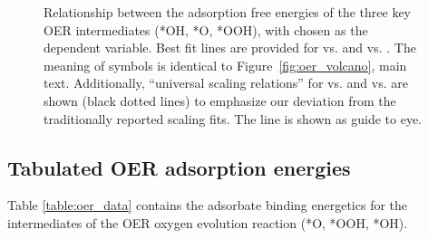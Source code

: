 \begin{figure}[!htb]
\centering
{}
\caption{\label{fig:scaling_relations}
%
Relationship between the adsorption free energies of the three key OER intermediates (*OH, *O, *OOH), with \DGOH chosen as the dependent variable.
%
Best fit lines are provided for \DGOOH vs. \DGOH and \DGO vs. \DGOH.
%
The meaning of symbols is identical to Figure~\ref{fig:oer_volcano}, main text.
%
Additionally, ``universal scaling relations'' for \DGOOH vs. \DGOH and \DGO vs. \DGOH are shown (black dotted lines) to emphasize our deviation from the traditionally reported scaling fits.
%
The \DGOH line is shown as guide to eye.
}
\end{figure}


\subsection{Tabulated OER adsorption energies}
%


%
%
Table \ref{table:oer_data} contains the adsorbate binding energetics for the intermediates of the OER
oxygen evolution reaction (*O, *OOH, *OH).



